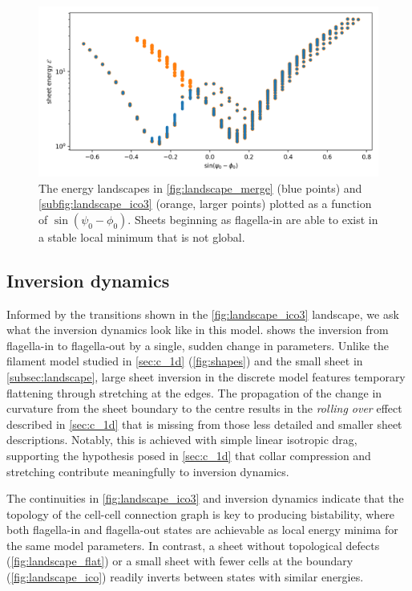 \begin{figure}[bthp]
	\centering
	\includegraphics[width=\textwidth]{collapse.png}
	\caption[Energy landscape of an inverting sheet projected onto a single axis]{The energy landscapes in \cref{fig:landscape_merge} (blue points) and \cref{subfig:landscape_ico3} (orange, larger points) plotted as a function of $\sin (\psi_0 - \phi_0)$. Sheets beginning as flagella-in are able to exist in a stable local minimum that is not global.}
	\label{fig:collapse}
\end{figure}

\subsection{Inversion dynamics} \label{subsec:dynamics}

Informed by the transitions shown in the \cref{fig:landscape_ico3} landscape, we ask what the inversion dynamics look like in this model.
 shows the inversion from flagella-in to flagella-out by a single, sudden change in parameters.
Unlike the filament model studied in \cref{sec:c_1d} (\cref{fig:shapes}) and the small sheet in \cref{subsec:landscape}, large sheet inversion in the discrete model features temporary flattening through stretching at the edges.
The propagation of the change in curvature from the sheet boundary to the centre results in the \textit{rolling over} effect described in \cref{sec:c_1d} that is missing from those less detailed and smaller sheet descriptions. 
Notably, this is achieved with simple linear isotropic drag, supporting the hypothesis posed in \cref{sec:c_1d} that collar compression and stretching contribute meaningfully to inversion dynamics.

The continuities in \cref{fig:landscape_ico3} and inversion dynamics indicate that the topology of the cell-cell connection graph is key to producing bistability, where both flagella-in and flagella-out states are achievable as local energy minima for the same model parameters.
In contrast, a sheet without topological defects (\cref{fig:landscape_flat}) or a small sheet with fewer cells at the boundary (\cref{fig:landscape_ico}) readily inverts between states with similar energies.

